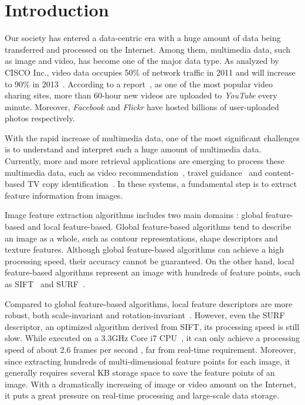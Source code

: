 \section{Introduction}
\label{sec:introduction}

Our society has entered a data-centric era with a huge amount of data being transferred and processed on the Internet. Among them, multimedia data, such as image and video, has become one of the major data type. As analyzed by CISCO Inc., video data occupies 50\% of network traffic in 2011 and will increase to 90\% in 2013~\cite{index2010forecast}.  According to a report~\cite{jansohn2009detecting}, as one of the most popular video sharing sites, more than 60-hour new videos are uploaded to \emph{YouTube} every minute. Moreover, \emph{Facebook} and \emph{Flickr} have hosted billions of user-uploaded photos respectively.

With the rapid increase of multimedia data, one of the most significant challenges is to understand and interpret such a huge amount of multimedia data. Currently, more and more retrieval applications are emerging to process these multimedia data, such as video recommendation~\cite{videorecommendation2007}, travel guidance~\cite{travelguidance2010} and content-based TV copy identification~\cite{tvidentify2003}. In these systems, a fundamental step is to extract feature information from images. 

Image feature extraction algorithms includes two main domains : global feature-based and local feature-based. Global feature-based algorithms tend to describe an image as a whole, such as contour representations, shape descriptors and texture features. Although global feature-based algorithms can achieve a high processing speed, their accuracy cannot be guaranteed. On the other hand, local feature-based algorithms represent  an image with hundreds of feature points, such as SIFT~\cite{Lowe2004SIFT,RobHess} and SURF~\cite{Bay2006SURF,Evans20009OpenSURF}. 

Compared to global feature-based algorithms, local feature descriptors are more robust, both scale-invariant and rotation-invariant~\cite{mikolajczyk2005performance}\cite{Bauer2007Evaluation}. However, even the SURF descriptor, an optimized algorithm derived from SIFT, its processing speed is still slow. While executed on a 3.3GHz Core i7 CPU~\cite{Fang2011ispass}, it can only achieve a processing speed of  about 2.6 frames per second , far from real-time requirement. Moreover, since extracting hundreds of multi-dimensional feature points for each image, it generally requires several KB storage space to save the feature points of an image. With a dramatically increasing of image or video amount on the Internet, it puts a great pressure on real-time processing and large-scale data storage.

